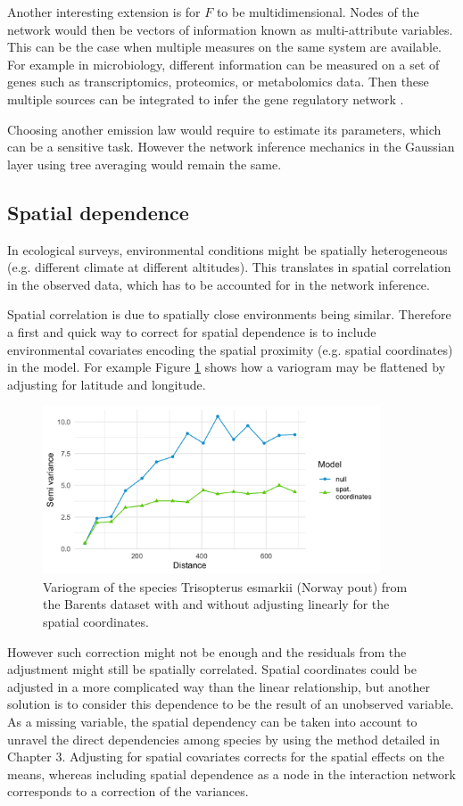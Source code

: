 Another interesting extension is for $F$ to be multidimensional.  Nodes of the network would then be vectors of information known as multi-attribute variables. This can be the case when multiple measures on the same system are available. For example in microbiology, different information can be measured on a set of genes such as transcriptomics, proteomics, or metabolomics data. Then these multiple sources can be integrated to infer the gene regulatory network \citep{CRS19,SFC19}.  

Choosing another emission law  would require to estimate its parameters, which can be a sensitive task. However the network inference mechanics in the Gaussian layer using tree averaging would remain the same. 

\subsection{Spatial dependence}
In ecological surveys, environmental conditions might be spatially heterogeneous (e.g. different climate at different altitudes).   This translates in spatial correlation in the observed data, which has to be accounted for in the network inference.

Spatial correlation is due to spatially close environments being similar. Therefore a first and quick way to correct for spatial dependence is to include environmental covariates encoding the spatial proximity (e.g. spatial coordinates) in the model. For example Figure \ref{vario} shows how a variogram may be flattened by adjusting for latitude and longitude.
\begin{figure}
\centering
\includegraphics[width=10cm]{figs/variogram.png}
\caption{Variogram of the species Trisopterus esmarkii (Norway pout) from the Barents dataset with and without adjusting linearly for the spatial coordinates.}
\label{vario}
\end{figure}
However such correction might not be enough and the residuals from the adjustment might still be spatially correlated. Spatial coordinates could be adjusted in a more complicated way than the linear relationship, but another solution is to consider this dependence to be the result of an unobserved variable. As a missing variable, the spatial dependency can be taken into account to unravel the direct dependencies among species by using the method detailed in Chapter 3. Adjusting for spatial covariates corrects for the spatial effects on the means, whereas including spatial dependence  as a node in the interaction network corresponds to a correction of the variances.


